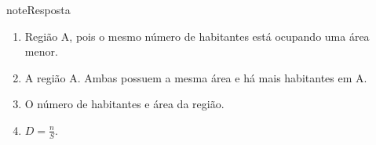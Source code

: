\begin{sphinxadmonition}{note}{Resposta}
\begin{enumerate}
\item {} 
Região A, pois o mesmo número de habitantes está ocupando uma área menor.

\item {} 
A região A. Ambas possuem a mesma área e há mais habitantes em A.

\item {} 
O número de habitantes e área da região.

\item {} 
\(D = \frac{n}{S}\).

\end{enumerate}
\end{sphinxadmonition}
\label{\detokenize{NO103-2:ativ-unidades-medida-e-og-flutuabilidade}}
